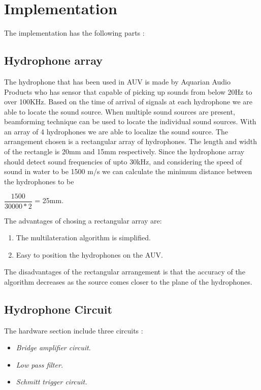 \section{Implementation}\label{sec:implementation}
The implementation has the following parts :

\subsection{Hydrophone array}
The hydrophone that has been used in AUV is made by Aquarian Audio Products who has sensor that capable of picking up sounds from below 20Hz to over 100KHz. Based on the time of arrival of signals at each hydrophone we are able to locate the sound source. When multiple sound sources are present, beamforming technique can be used to locate the individual sound sources. \newline
With an array of 4 hydrophones we are able to localize the sound source. The arrangement chosen is a rectangular array of hydrophones. The length and width of the rectangle is 20mm and 15mm respectively. Since the hydrophone array should detect sound frequencies of upto 30kHz, and considering the speed of sound in water to be 1500 m/s we can calculate the minimum distance between the hydrophones to be 
\begin{center}
$\dfrac{1500}{30000 * 2}$ = 25mm.
\end{center}

The advantages of chosing a rectangular array are:\begin{enumerate}
\item The multilateration algorithm is simplified.
\item Easy to position the hydrophones on the AUV.
\end{enumerate}
The disadvantages of the rectangular arrangement is that the accuracy of the algorithm decreases as the source comes closer to the plane of the hydrophones. 


\subsection{Hydrophone Circuit}
The hardware section include three circuits :
\begin{itemize}
   \item { \em Bridge amplifier circuit.}
   \item { \em Low pass filter. }
   \item { \em Schmitt trigger circuit. }
\end{itemize}
